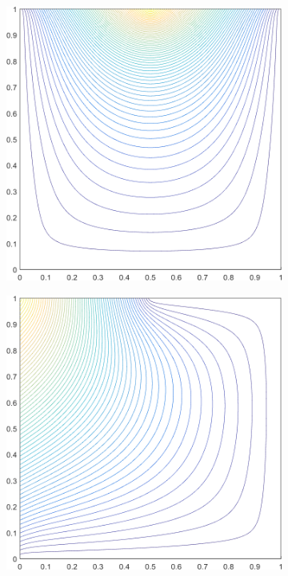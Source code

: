 \begin{figure}
\label{fig::2D_MV1_deg_square_basis_functions}
\centering
	\begin{subfigure}[b]{0.39\textwidth}
		\centering
		\includegraphics[width=\textwidth]{figures/sec_BF/deg_square_MV1_contour_b4.png}
		\caption{}
	\end{subfigure}
	\vfill
	\begin{subfigure}[b]{0.39\textwidth}
		\centering
		\includegraphics[width=\textwidth]{figures/sec_BF/deg_square_MV1_contour_b5.png}

\end{subfigure}
\end{figure}
